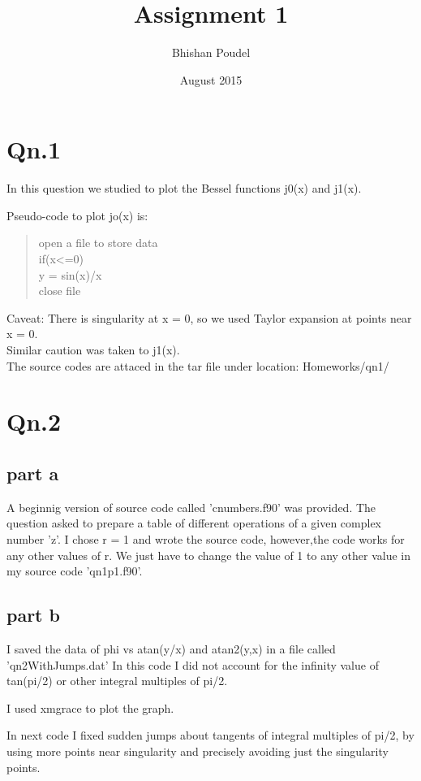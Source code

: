 \documentclass{article}
\title{Assignment 1}
\author{Bhishan Poudel}
\date{August 2015}
\begin{document}
\maketitle

\section{Qn.1}

In this question we studied to plot the Bessel functions j0(x) and j1(x).


Pseudo-code to plot jo(x) is:
\begin{verse}
    open a file to store data\\
        if(x<=0)\\
            y = sin(x)/x\\
    close file\\ 
\end{verse}    
Caveat: There is singularity at x = 0, so we used Taylor expansion at points near x = 0.\\
Similar caution was taken to j1(x).\\
The source codes are attaced in the tar file under location:
Homeworks/qn1/

\section{Qn.2}
\subsection{part a}
A beginnig version of source code called 'cnumbers.f90' was provided.
The question asked to prepare a table of different operations of a given
complex number 'z'.
I chose r = 1 and wrote the source code, however,the code works for any other
values of r. We just have to change the value of 1 to any other value in my source
code 'qn1p1.f90'.

\subsection{part b} 

I saved the data of phi vs atan(y/x) and atan2(y,x) in a file called 'qn2WithJumps.dat'
In this code I did not account for the infinity value of tan(pi/2) or other 
integral multiples of pi/2.

I used xmgrace to plot the graph.

In next code I fixed sudden jumps about tangents of integral multiples of pi/2,
by using more points near singularity and precisely avoiding just the singularity
points.
\end{document}
